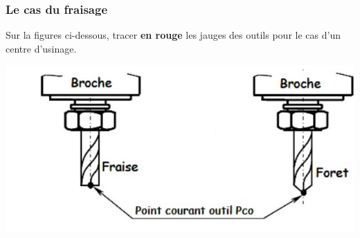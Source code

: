 \documentclass[12pt]{article}
\newcounter{exo}
\newenvironment{exo}{\stepcounter{exo}\vspace{0.5cm}{\bfseries Question \theexo\ :}}{\par\vspace{0.5cm}}
\begin{document}
\subsubsection{Le cas du fraisage}

\begin{exo}\label{exo1} Sur la figures ci-dessous, tracer \textbf{en rouge} les jauges des outils pour le cas d'un centre d'usinage.\end{exo}
\begin{center}
\includegraphics[width=0.8\linewidth]{jauge2.JPG}
\end{center}
\end{document}
